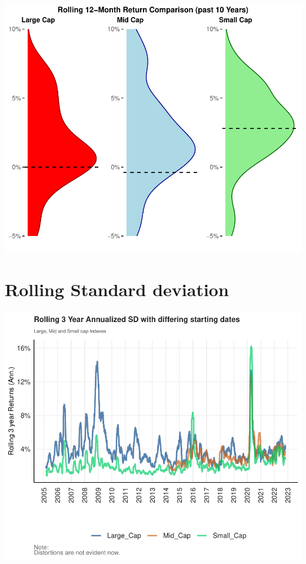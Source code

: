 \documentclass[11pt,preprint, authoryear]{elsarticle}
\let\origfigure\figure
\let\endorigfigure\endfigure
\renewenvironment{figure}[1][2] {
    \expandafter\origfigure\expandafter[H]
} {
    \endorigfigure
}
\numberwithin{equation}{section}
\numberwithin{figure}{section}
\numberwithin{table}{section}
\begin{document}
\begin{figure}[H]

{\centering \includegraphics{Volatility-of-Shares_files/figure-latex/Figure8-1} 

}

\caption{Rolling 12-Month Returns Comparison (past 10 Years) \label{Figure8}}\label{fig:Figure8}
\end{figure}

\hypertarget{rolling-standard-deviation}{%
\section{\texorpdfstring{Rolling Standard deviation
\label{Standard deviation}}{Rolling Standard deviation }}\label{rolling-standard-deviation}}

\begin{figure}[H]

{\centering \includegraphics{Volatility-of-Shares_files/figure-latex/Figure9-1} 

}

\caption{Rolling Annualised Standard Deviation of the Indexes \label{Figure9}}\label{fig:Figure9}
\end{figure}
\end{document}

